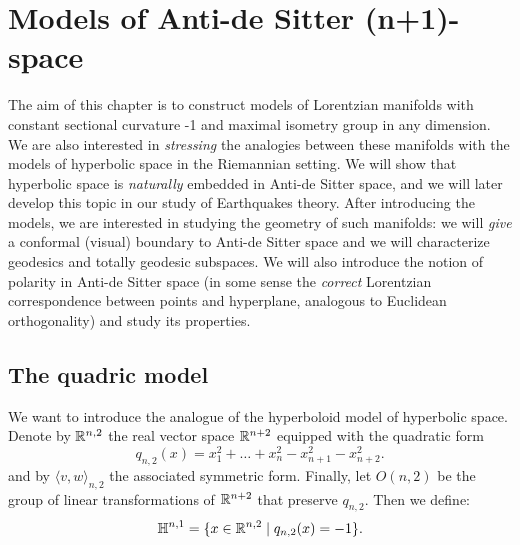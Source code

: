 \chapter{Models of Anti-de Sitter (n+1)-space}
The aim of this chapter is to construct models of Lorentzian manifolds with constant sectional curvature -1 and maximal isometry group in any dimension. We are also interested in \textit{stressing} the analogies between these manifolds with the models of hyperbolic space in the Riemannian setting. We will show that hyperbolic space is \textit{naturally} embedded in Anti-de Sitter space, and we will later develop this topic in our study of Earthquakes theory. After introducing the models, we are interested in studying the geometry of such manifolds: we will \textit{give} a conformal (visual) boundary to Anti-de Sitter space and we will characterize geodesics and totally geodesic subspaces. We will also introduce the notion of polarity in Anti-de Sitter space (in some sense the \textit{correct} Lorentzian correspondence between points and hyperplane, analogous to Euclidean orthogonality) and study its properties. 

\section{The quadric model}
We want to introduce the analogue of the hyperboloid model of hyperbolic space. Denote by $\mathbb{R}^{n,2}$ the real vector space $\mathbb{R}^{n+2}$ equipped with the quadratic form 
\[
    q_{n,2}(x)=x_1^{2}+\dots+x_n^{2}-x_{n+1}^{2}-x_{n+2}^2.   
\]
and by $\langle v,w\rangle_{n,2}$ the associated symmetric form. Finally, let $O(n,2)$ be the group of linear transformations of $\mathbb{R}^{n+2}$ that preserve $q_{n,2}.$
Then we define:
\[
    \mathbb{H}^{n,1}=\{x\in \mathbb{R}^{n,2}\;|\;q_{n,2}(x)=-1\}.
\]

